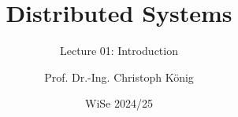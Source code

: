 \date[2024]{WiSe 2024/25}
\title[DS]{Distributed Systems}
\subtitle[Introduction]{Lecture 01: Introduction}
\author[Christoph König]{Prof. Dr.-Ing. Christoph König}

\newcommand{\moodlelink}{https://lernen.hs-fulda.de/course/view.php?id=20980}
\newcommand{\moodlecourseid}{Verteilte Systeme - AI1015 (WiSe24/25)}

